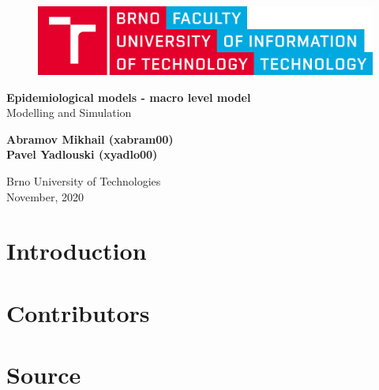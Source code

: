 \documentclass[12pt,a4paper]{article}
\begin{document}
    \begin{titlepage}
        \begin{center}
            \vspace*{1cm}
        
            \begin{figure}[h!]
                \includegraphics[scale=0.12]{VUT-FIT-logo-en.png}
            \end{figure}
            \vspace{1.5cm}

            \Large{\textbf{Epidemiological models - macro level model}} \\
            \large{Modelling and Simulation}

            \vspace{0.5cm}
                
            \vspace{1.5cm}
            
            \textbf{Abramov Mikhail (xabram00)} \\
            \textbf{Pavel Yadlouski (xyadlo00)} 

            \vfill
                
            \vspace{0.8cm}
        
            Brno University of Technologies\\
            November, 2020
                
        \end{center}
    \end{titlepage}

    \tableofcontents
    \newpage

    \section{Introduction}

    \section{Contributors}

    \section{Source}
\end{document}
